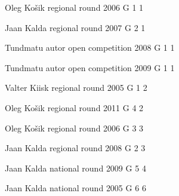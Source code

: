 \documentclass[11pt]{article}
\begin{document}
\ylDisplay{} %
{Oleg Košik} %
{regional round} %
{2006} %
{G 1} %
{1} %
{

\ifEngStatement
\fi
}

\ylDisplay{} %
{Jaan Kalda} %
{regional round} %
{2007} %
{G 2} %
{1} %
{

\ifEngStatement
\fi
}

\ylDisplay{} %
{Tundmatu autor} %
{open competition} %
{2008} %
{G 1} %
{1} %
{

\ifEngStatement
\fi
}

\ylDisplay{} %
{Tundmatu autor} %
{open competition} %
{2009} %
{G 1} %
{1} %
{

\ifEngStatement
\fi
}

\ylDisplay{} %
{Valter Kiisk} %
{regional round} %
{2005} %
{G 1} %
{2} %
{

\ifEngStatement
\fi
}

\ylDisplay{} %
{Oleg Košik} %
{regional round} %
{2011} %
{G 4} %
{2} %
{

\ifEngStatement
\fi
}

\ylDisplay{} %
{Oleg Košik} %
{regional round} %
{2006} %
{G 3} %
{3} %
{

\ifEngStatement
\fi
}

\ylDisplay{} %
{Jaan Kalda} %
{regional round} %
{2008} %
{G 2} %
{3} %
{

\ifEngStatement
\fi
}

\ylDisplay{} %
{Jaan Kalda} %
{national round} %
{2009} %
{G 5} %
{4} %
{

\ifEngStatement
\fi
}

\ylDisplay{} %
{Jaan Kalda} %
{national round} %
{2005} %
{G 6} %
{6} %
{

\ifEngStatement
\fi
}
\end{document}
